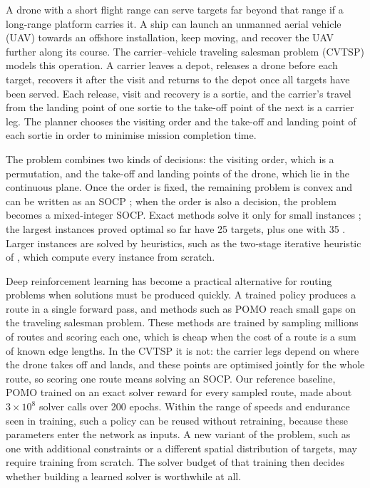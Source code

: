 \documentclass[preprint,12pt,authoryear]{elsarticle}
\begin{document}
A drone with a short flight range can serve targets far beyond that range if a long-range platform carries it. A ship can launch an unmanned aerial vehicle (UAV) towards an offshore installation, keep moving, and recover the UAV further along its course. The carrier--vehicle traveling salesman problem (CVTSP) \citep{garone2011} models this operation. A carrier leaves a depot, releases a drone before each target, recovers it after the visit and returns to the depot once all targets have been served. Each release, visit and recovery is a sortie, and the carrier's travel from the landing point of one sortie to the take-off point of the next is a carrier leg. The planner chooses the visiting order and the take-off and landing point of each sortie in order to minimise mission completion time.

The problem combines two kinds of decisions: the visiting order, which is a permutation, and the take-off and landing points of the drone, which lie in the continuous plane. Once the order is fixed, the remaining problem is convex and can be written as an SOCP \citep{lobo1998}; when the order is also a decision, the problem becomes a mixed-integer SOCP. Exact methods solve it only for small instances \citep{gambella2018,erdogan2021}; the largest instances proved optimal so far have 25 targets, plus one with 35 \citep{vieira2026}. Larger instances are solved by heuristics, such as the two-stage iterative heuristic of \citet{li2025}, which compute every instance from scratch.

Deep reinforcement learning has become a practical alternative for routing problems when solutions must be produced quickly. A trained policy produces a route in a single forward pass, and methods such as POMO \citep{kwon2020} reach small gaps on the traveling salesman problem. These methods are trained by sampling millions of routes and scoring each one, which is cheap when the cost of a route is a sum of known edge lengths. In the CVTSP it is not: the carrier legs depend on where the drone takes off and lands, and these points are optimised jointly for the whole route, so scoring one route means solving an SOCP. Our reference baseline, POMO trained on an exact solver reward for every sampled route, made about $3 \times 10^{8}$ solver calls over 200 epochs. Within the range of speeds and endurance seen in training, such a policy can be reused without retraining, because these parameters enter the network as inputs. A new variant of the problem, such as one with additional constraints or a different spatial distribution of targets, may require training from scratch. The solver budget of that training then decides whether building a learned solver is worthwhile at all.
\end{document}

